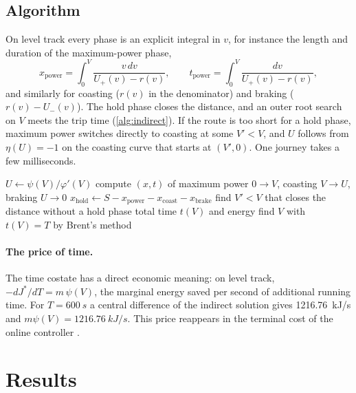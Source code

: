 \documentclass[11pt,a4paper]{article}
\begin{document}
\subsection{Algorithm}

On level track every phase is an explicit integral in $v$, for instance the length and duration of the
maximum-power phase,
\begin{equation}
  x_{\text{power}} = \int_0^V \frac{v\,dv}{U_+(v) - r(v)}, \qquad t_{\text{power}} = \int_0^V \frac{dv}{U_+(v) - r(v)},
\end{equation}
and similarly for coasting ($r(v)$ in the denominator) and braking ($r(v) - U_-(v)$). The hold phase closes the
distance, and an outer root search on $V$ meets the trip time (\cref{alg:indirect}). If the route is too short for a
hold phase, maximum power switches directly to coasting at some $V' < V$, and $U$ follows from $\eta(U) = -1$ on the
coasting curve that starts at $(V', 0)$. One journey takes a few milliseconds.

\begin{algorithm}[h]
\caption{Optimal journey on level track (no speed limit active, no regenerative braking)}\label{alg:indirect}
\begin{algorithmic}[1]
  \State $U \gets \psi(V)/\varphi'(V)$ 
  \State compute $(x, t)$ of maximum power $0 \to V$, coasting $V \to U$, braking $U \to 0$
  \State $x_{\text{hold}} \gets S - x_{\text{power}} - x_{\text{coast}} - x_{\text{brake}}$
   find $V' < V$ that closes the distance without a hold phase \EndIf
  \State \Return total time $t(V)$ and energy
\EndFunction
\State find $V$ with $t(V) = T$ by Brent's method 
\end{algorithmic}
\end{algorithm}

\paragraph{The price of time.} The time costate has a direct economic meaning: on level track,
$-dJ^*/dT = m\,\psi(V)$, the marginal energy saved per second of additional running time. For $T = \SI{600}{s}$ a
central difference of the indirect solution gives \SI{1216.76}{kJ/s} and $m\psi(V) = \SI{1216.76}{kJ/s}$. This price
reappears in the terminal cost of the online controller \citep{RepoMPC}.

\section{Results}\label{sec:results}
\end{document}
